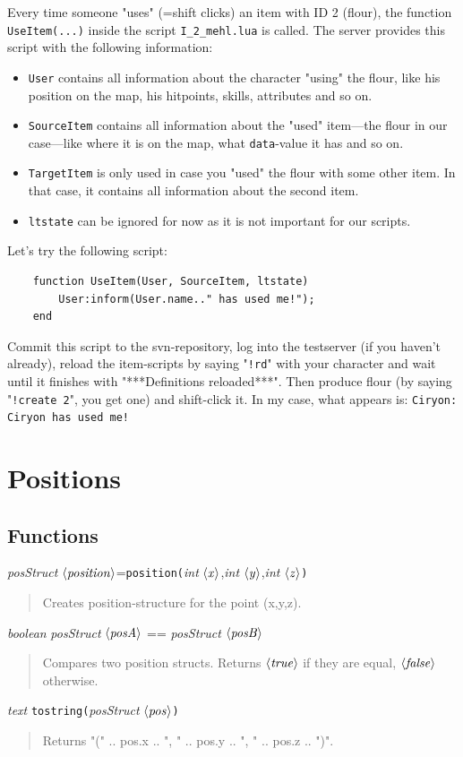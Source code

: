 \documentclass[a4paper,10pt,makeidx]{scrreprt}
\newcommand{\com}[2]{\index{#1}\texttt{#1(}#2\texttt{)}}
\newcommand{\var}[1]{$\left\langle \text{\emph{#1}} \right\rangle$}
\newcommand{\integer}{\textsl{int }}
\newcommand{\txt}{\textsl{text }}
\newcommand{\bool}{\textsl{boolean }}
\newcommand{\position}{\textsl{posStruct }}
\begin{document}
Every time someone "uses" (=shift clicks) an item with ID 2 (flour), the function {\tt UseItem(...)} inside the script {\tt I\_2\_mehl.lua} is called. The server provides this script with the following information:
\begin{itemize}
    \item {\tt User} contains all information about the character "using" the flour, like his position on the map, his hitpoints, skills, attributes and so on.
    \item {\tt SourceItem} contains all information about the "used" item---the flour in our case---like where it is on the map, what {\tt data}-value it has and so on.
    \item {\tt TargetItem} is only used in case you "used" the flour with some other item. In that case, it contains all information about the second item.
    \item {\tt ltstate} can be ignored for now as it is not important for our scripts.
\end{itemize}
Let's try the following script:
\begin{verbatim}
    function UseItem(User, SourceItem, ltstate)
        User:inform(User.name.." has used me!");
    end
\end{verbatim}
Commit this script to the svn-repository, log into the testserver (if you haven't already), reload the item-scripts by saying "{\tt !rd}" with your character and wait until it finishes with "***Definitions reloaded***". Then produce flour (by saying "{\tt !create 2}", you get one) and shift-click it. In my case, what appears is: {\tt Ciryon: Ciryon has used me!}

\chapter{Positions}

\section{Functions}
\position \var{position}=\com{position}{\integer \var{x},\integer \var{y},\integer \var{z}}
\begin{quote}
Creates position-structure for the point (x,y,z).\\
\end{quote}
\bool \position \var{posA} == \position \var{posB}
\begin{quote}
Compares two position structs. Returns \var{true} if they are equal, \var{false} otherwise.
\end{quote}
\txt \com{tostring}{\position \var{pos}}
\begin{quote}
Returns "(" .. pos.x .. ", " .. pos.y .. ", " .. pos.z .. ")".
\end{quote}
\end{document}
